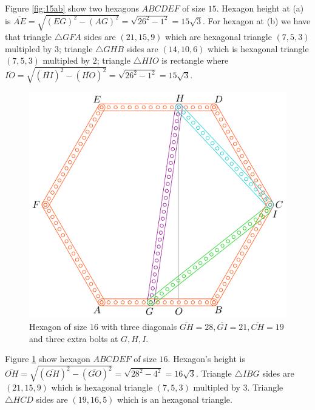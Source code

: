 \documentclass[11pt]{article}
\begin{document}
Figure \ref{fig:15ab} show two hexagons $ABCDEF$ of size $15$. Hexagon height at (a) is $\overline{AE} = \sqrt{(EG)^2 - (AG)^2} = \sqrt{26^2 - 1^2} = 15\sqrt3.$ For hexagon at (b) we have that triangle $\triangle{GFA}$ sides are $(21,15,9)$ which are hexagonal triangle $(7,5,3)$ multipled by $3$; triangle $\triangle{GHB}$ sides are $(14,10,6)$ which is hexagonal triangle $(7,5,3)$ multipled by $2$; triangle $\triangle{HIO}$ is rectangle where $\overline{IO} = \sqrt{(\overline{HI})^2 - (\overline{HO})^2} = \sqrt{26^2 - 1^2} = 15\sqrt3$.

\begin{figure}[H]
\centering
\includegraphics[scale=1]{16/hexa-16a}
\caption{Hexagon of size $16$ with three diagonals $\overline{GH} = 28, \overline{GI} = 21, \overline{CH} = 19$ and three extra bolts at $G,H,I$.}
\label{fig:16a}
\end{figure}

Figure \ref{fig:16a} show hexagon $ABCDEF$ of size $16$. Hexagon's height is $\overline{OH}=\sqrt{(\overline{GH})^2-(\overline{GO})^2}=\sqrt{28^2-4^2}=16\sqrt3$. Triangle $\triangle{IBG}$ sides are $(21,15,9)$ which is hexagonal triangle $(7,5,3)$ multipled by $3$. Triangle $\triangle{HCD}$ sides are $(19,16,5)$ which is an hexagonal triangle.
\end{document}
